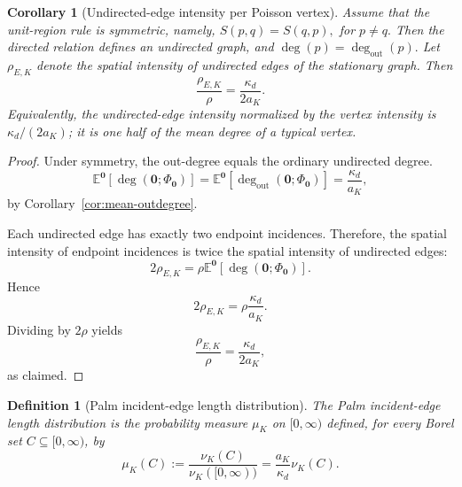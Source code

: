 \documentclass[a4paper,fleqn]{cas-dc}
\numberwithin{equation}{section}
\newcommand{\E}{\mathds{E}}
\newcommand{\1}{\mathds{1}}
\newcommand{\0}{\mathbf{0}}
\newtheorem{corollary}[theorem]{Corollary}
\newtheorem{definition}[theorem]{Definition}
\begin{document}
\begin{corollary}[Undirected-edge intensity per Poisson vertex]
\label{cor:edge-intensity-per-vertex}
Assume that the unit-region rule is symmetric, namely,
\(
S(p,q)
=
S(q,p), 
\)
 for 
\(
p\neq q.
\)
Then the directed relation defines an undirected graph, and
\(
\deg(p)
=
\deg_{\mathrm{out}}(p).
\)
Let \(\rho_{E,K}\) denote the spatial intensity of undirected edges of
the stationary graph. Then
\begin{equation}
\label{eq:edge-intensity-per-vertex}
\frac{\rho_{E,K}}{\rho}
=
\frac{\kappa_d}{2a_K}.
\end{equation}
Equivalently, the undirected-edge intensity normalized by the
vertex intensity is \(\kappa_d/(2a_K)\); it is one half of the
mean degree of a typical vertex.
\end{corollary}

\begin{proof}
Under symmetry, the out-degree equals the ordinary undirected degree.
\begin{equation}
\E^{\0}\left[
    \deg
\left(
\0;
\Phi_{\0}
\right)
\right]
=
\E^{\0}\left[
    \deg_{\mathrm{out}}
\left(
\0;
\Phi_{\0}
\right)
\right]
=
\frac{\kappa_d}{a_K},
\end{equation}
by Corollary~\ref{cor:mean-outdegree}.


Each undirected edge has exactly two endpoint incidences. Therefore,
the spatial intensity of endpoint incidences is twice the spatial
intensity of undirected edges:
\begin{equation}
2\rho_{E,K}
=
\rho
\E^{\0}\left[
\deg
\left(
\0;
\Phi_{\0}
\right)
\right].
\end{equation}
Hence
\begin{equation}
2\rho_{E,K}
=
\rho\frac{\kappa_d}{a_K}.
\end{equation}
Dividing by \(2\rho\) yields
\begin{equation}
\frac{\rho_{E,K}}{\rho}
=
\frac{\kappa_d}{2a_K},
\end{equation}
as claimed.
\end{proof}



\begin{definition}[Palm incident-edge length distribution]
\label{def:palm-edge-length-distribution}
The Palm incident-edge length distribution is the probability measure
\(\mu_K\) on \([0,\infty)\) defined, for every Borel set
\(C\subseteq[0,\infty)\), by
\begin{equation}
\label{eq:palm-edge-length-distribution}
\mu_K(C)
:=
\frac{\nu_K(C)}
{\nu_K([0,\infty))}
=
\frac{a_K}{\kappa_d}\nu_K(C).
\end{equation}
\end{definition}
\end{document}
